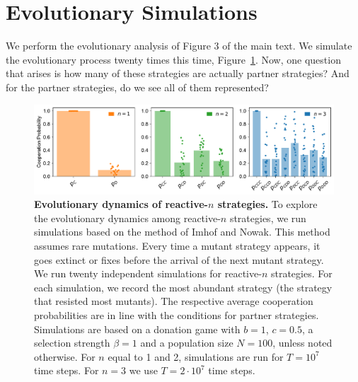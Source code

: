 \documentclass[11pt]{article}
\theoremstyle{plainCl1}
\theoremstyle{plainCl2}
\begin{document}

\section{Evolutionary Simulations}

We perform the evolutionary analysis of Figure 3 of the main text. We simulate
the evolutionary process twenty times this time,
Figure~\ref{fig:evolutionary_results}. Now, one question that arises is how many
of these strategies are actually partner strategies? And for the partner
strategies, do we see all of them represented? \\

\begin{figure}[tbhp]
    \centering
    \includegraphics[width=\textwidth]{../../figures/siFig3AbundantStrategies.pdf}
    \caption{\textbf{Evolutionary dynamics of reactive-$n$ strategies.}
    To explore the evolutionary dynamics among reactive-$n$ strategies, we run simulations based on the
    method of Imhof and Nowak. 
    This method assumes rare mutations. 
    Every time a mutant strategy appears, it goes extinct or fixes before the arrival of the next mutant strategy. 
    We run twenty independent simulations for reactive-$n$ strategies.
    For each simulation, we record the most abundant strategy (the strategy that resisted most mutants). 
    The respective average cooperation probabilities are in line with the conditions for partner strategies. 
    Simulations are based on a donation game with \(b\!=\!1\),  \(c\!=\!0.5\), a selection strength $\beta\!=\!1$
    and a population size $N\!=\!100$, unless noted otherwise. For $n$ equal to 1 and 2, simulations are run for \(T\!=\! 10 ^ 7\) time steps. For $n\!=\!3$ we use \(T\!=\! 2 \!\cdot\!10 ^ 7\) time steps.
    }\label{fig:evolutionary_results}
\end{figure}
\end{document}
